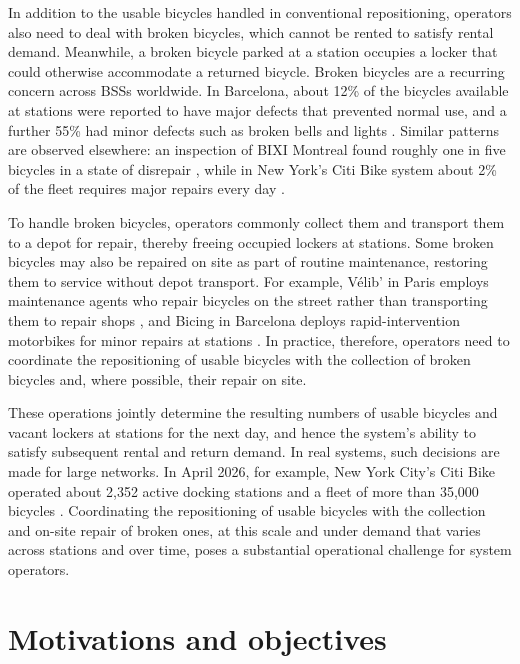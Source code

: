In addition to the usable bicycles handled in conventional repositioning, operators also need to deal with broken bicycles, which cannot be rented to satisfy rental demand. Meanwhile, a broken bicycle parked at a station occupies a locker that could otherwise accommodate a returned bicycle. Broken bicycles are a recurring concern across BSSs worldwide. In Barcelona, about 12\% of the bicycles available at stations were reported to have major defects that prevented normal use, and a further 55\% had minor defects such as broken bells and lights \citep{castrofernandezContributionBikesharingSustainable2011}. Similar patterns are observed elsewhere: an inspection of BIXI Montreal found roughly one in five bicycles in a state of disrepair \citep{demaioMeddinBikeSharingBlogMontreal2009}, while in New York's Citi Bike system about 2\% of the fleet requires major repairs every day \citep{kaspiBikesharingSystemsUser2017}.

To handle broken bicycles, operators commonly collect them and transport them to a depot for repair, thereby freeing occupied lockers at stations. Some broken bicycles may also be repaired on site as part of routine maintenance, restoring them to service without depot transport. For example, Vélib' in Paris employs maintenance agents who repair bicycles on the street rather than transporting them to repair shops \citep{tironiRepairingMaintainingPublic2012}, and Bicing in Barcelona deploys rapid-intervention motorbikes for minor repairs at stations \citep{clearchannelBicingBarcelona2010}. In practice, therefore, operators need to coordinate the repositioning of usable bicycles with the collection of broken bicycles and, where possible, their repair on site.

These operations jointly determine the resulting numbers of usable bicycles and vacant lockers at stations for the next day, and hence the system's ability to satisfy subsequent rental and return demand. In real systems, such decisions are made for large networks. In April 2026, for example, New York City's Citi Bike operated about 2,352 active docking stations and a fleet of more than 35,000 bicycles \citep{citibikeAprilMonthlyReport2026}. Coordinating the repositioning of usable bicycles with the collection and on-site repair of broken ones, at this scale and under demand that varies across stations and over time, poses a substantial operational challenge for system operators.

\section{Motivations and objectives}\label{sec:intro-motivations}


